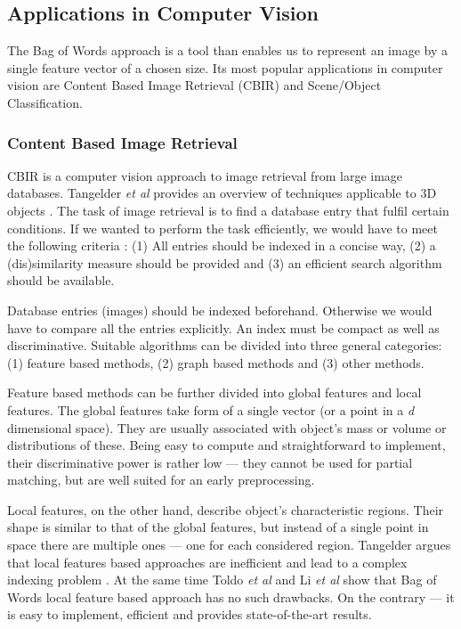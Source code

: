 \documentclass[11pt,twoside]{article}
\begin{document}
  \subsection{Applications in Computer Vision}
    The Bag of Words approach is a tool than enables us to represent an image by a single feature vector of a chosen size. Its most popular applications in computer vision are Content Based Image Retrieval (CBIR) and Scene/Object Classification.

  \subsubsection{Content Based Image Retrieval}
    CBIR is a computer vision approach to image retrieval from large image databases. Tangelder \emph{et al} provides an overview of techniques applicable to 3D objects \cite{tangelder2008survey}. The task of image retrieval is to find a database entry that fulfil certain conditions. If we wanted to perform the task efficiently, we would have to meet the following criteria \cite{toldo2009bag}: (1) All entries should be indexed in a concise way, (2) a (dis)similarity measure should be provided and (3) an efficient search algorithm should be available. 
    
    Database entries (images) should be indexed beforehand. Otherwise we would have to compare all the entries explicitly. An index must be compact as well as discriminative. Suitable algorithms can be divided into three general categories: (1) feature based methods, (2) graph based methods and (3) other methods.

    Feature based methods can be further divided into global features and local features. The global features take form of a single vector (or a point in a \emph{d} dimensional space). They are usually associated with object's mass or volume or distributions of these. Being easy to compute and straightforward to implement, their discriminative power is rather low --- they cannot be used for partial matching, but are well suited for an early preprocessing. 
    
    Local features, on the other hand, describe object's characteristic regions. Their shape is similar to that of the global features, but instead of a single point in space there are multiple ones --- one for each considered region. Tangelder argues that local features based approaches are inefficient and lead to a complex indexing problem \cite{tangelder2008survey}. At the same time Toldo \emph{et al} and Li \emph{et al} show that Bag of Words local feature based approach has no such drawbacks. On the contrary --- it is easy to implement, efficient and provides state-of-the-art results.
    
\end{document}
